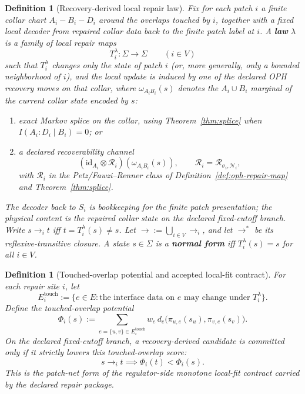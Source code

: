 \documentclass[11pt]{article}
\newtheorem{definition}[theorem]{Definition}
\theoremstyle{remark}
\theoremstyle{plain}
\begin{document}
\begin{definition}[Recovery-derived local repair law]\label{def:repair}
Fix for each patch \(i\) a finite collar chart \(A_i\!-\!B_i\!-\!D_i\) around the overlaps touched
by \(i\), together with a fixed local decoder from repaired collar data back to the finite patch
label at \(i\). A \textbf{law} \(\lambda\) is a family of local repair maps
\[
T_i^\lambda:\Sigma\to\Sigma
\qquad (i\in V)
\]
such that \(T_i^\lambda\) changes only the state of patch \(i\) (or, more generally, only a
bounded neighborhood of \(i\)), and the local update is induced by one of the declared OPH
recovery moves on that collar, where \(\omega_{A_iB_i}(s)\) denotes the \(A_i\cup B_i\) marginal
of the current collar state encoded by \(s\):
\begin{enumerate}[label=(\roman*),leftmargin=2em]
\item exact Markov splice on the collar, using Theorem~\ref{thm:splice} when
      \(I(A_i:D_i\mid B_i)=0\); or
\item a declared recoverability channel
\[
(\mathrm{id}_{A_i}\otimes \mathcal R_i)(\omega_{A_iB_i}(s)),
\qquad
\mathcal R_i=\mathcal R_{\sigma_i,\mathcal N_i},
\]
      with \(\mathcal R_i\) in the Petz/Fawzi--Renner class of
      Definition~\ref{def:oph-repair-map} and Theorem~\ref{thm:splice}.
\end{enumerate}
The decoder back to \(S_i\) is bookkeeping for the finite patch presentation; the physical content
is the repaired collar state on the declared fixed-cutoff branch. Write \(s\to_i t\) iff
\(t=T_i^\lambda(s)\neq s\). Let \(\to := \bigcup_{i\in V}\to_i\), and let \(\to^*\) be its
reflexive-transitive closure. A state \(s\in\Sigma\) is a \textbf{normal form} iff
\(T_i^\lambda(s)=s\) for all \(i\in V\).
\end{definition}

\begin{definition}[Touched-overlap potential and accepted local-fit contract]\label{def:localfit}
For each repair site \(i\), let
\[
E_i^{\mathrm{touch}}
:=
\bigl\{
e\in E:\text{the interface data on }e\text{ may change under }T_i^\lambda
\bigr\}.
\]
Define the touched-overlap potential
\[
\Phi_i(s)
:=
\sum_{e=\{u,v\}\in E_i^{\mathrm{touch}}}
w_e\, d_e\!\bigl(\pi_{u,e}(s_u),\pi_{v,e}(s_v)\bigr).
\]
On the declared fixed-cutoff branch, a recovery-derived candidate is committed only if it
strictly lowers this touched-overlap score:
\[
s\to_i t \implies \Phi_i(t)<\Phi_i(s).
\]
This is the patch-net form of the regulator-side monotone local-fit contract carried by the
declared repair package.
\end{definition}
\end{document}
